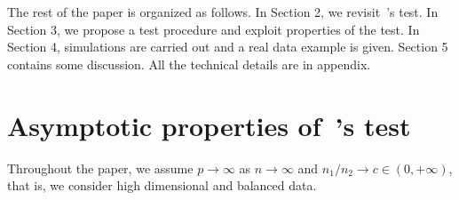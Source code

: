 \documentclass[review]{elsarticle}
\theoremstyle{plain}
\theoremstyle{definition}
\theoremstyle{remark}
\begin{document}






The rest of the paper is organized as follows. In Section 2,  we revisit~\cite{Chen2010A}'s test.  In Section 3, we propose a test procedure and exploit properties of the test.  In Section 4, simulations are carried out and  a real data example is given. Section 5 contains some discussion. All the technical details are in appendix.

\section{Asymptotic properties of~\cite{Chen2010A}'s test}\label{sec:chen}
    Throughout the paper, we  assume $p\to \infty$ as $n\to \infty$ and ${n_1}/{n_2}\to c \in (0,+\infty)$, that is, we consider high dimensional and balanced data.
\end{document}
